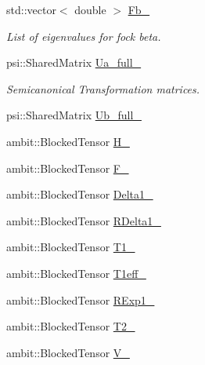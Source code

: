 \begin{DoxyCompactItemize}
std\+::vector$<$ double $>$ \mbox{\hyperlink{classforte_1_1_t_h_r_e_e___d_s_r_g___m_r_p_t2_a2ce9b1bafd6aac31d4ae430c99f7bdb2}{Fb\+\_\+}}
\begin{DoxyCompactList}\small\item\em List of eigenvalues for fock beta. \end{DoxyCompactList}\item 
psi\+::\+Shared\+Matrix \mbox{\hyperlink{classforte_1_1_t_h_r_e_e___d_s_r_g___m_r_p_t2_aba233967e2c2f524e5e8925940842568}{Ua\+\_\+full\+\_\+}}
\begin{DoxyCompactList}\small\item\em Semicanonical Transformation matrices. \end{DoxyCompactList}\item 
psi\+::\+Shared\+Matrix \mbox{\hyperlink{classforte_1_1_t_h_r_e_e___d_s_r_g___m_r_p_t2_acc3899fa2804b8c701dd7692fb2d2c31}{Ub\+\_\+full\+\_\+}}
\item 
ambit\+::\+Blocked\+Tensor \mbox{\hyperlink{classforte_1_1_t_h_r_e_e___d_s_r_g___m_r_p_t2_aff1c72fa0d67fb3923cad1ecf8523ada}{H\+\_\+}}
\item 
ambit\+::\+Blocked\+Tensor \mbox{\hyperlink{classforte_1_1_t_h_r_e_e___d_s_r_g___m_r_p_t2_a24ecc69de76df965864955ce07f30708}{F\+\_\+}}
\item 
ambit\+::\+Blocked\+Tensor \mbox{\hyperlink{classforte_1_1_t_h_r_e_e___d_s_r_g___m_r_p_t2_aef073cf400874b8f230fce4bafdabb8a}{Delta1\+\_\+}}
\item 
ambit\+::\+Blocked\+Tensor \mbox{\hyperlink{classforte_1_1_t_h_r_e_e___d_s_r_g___m_r_p_t2_a345d263a8eb243a7149f0ae4f85923d4}{R\+Delta1\+\_\+}}
\item 
ambit\+::\+Blocked\+Tensor \mbox{\hyperlink{classforte_1_1_t_h_r_e_e___d_s_r_g___m_r_p_t2_a27e598b1814559478b0ee7f0b96d75ae}{T1\+\_\+}}
\item 
ambit\+::\+Blocked\+Tensor \mbox{\hyperlink{classforte_1_1_t_h_r_e_e___d_s_r_g___m_r_p_t2_a24cdc8796181dcb699c9fa24754db3c3}{T1eff\+\_\+}}
\item 
ambit\+::\+Blocked\+Tensor \mbox{\hyperlink{classforte_1_1_t_h_r_e_e___d_s_r_g___m_r_p_t2_af90d92d1c7063b23e519dc633a2fc021}{R\+Exp1\+\_\+}}
\item 
ambit\+::\+Blocked\+Tensor \mbox{\hyperlink{classforte_1_1_t_h_r_e_e___d_s_r_g___m_r_p_t2_a9ef6998d8f97d5ce374159da88565b14}{T2\+\_\+}}
\item 
ambit\+::\+Blocked\+Tensor \mbox{\hyperlink{classforte_1_1_t_h_r_e_e___d_s_r_g___m_r_p_t2_af1efc005853c4374d0e970dca72acec0}{V\+\_\+}}

\end{DoxyCompactItemize}
